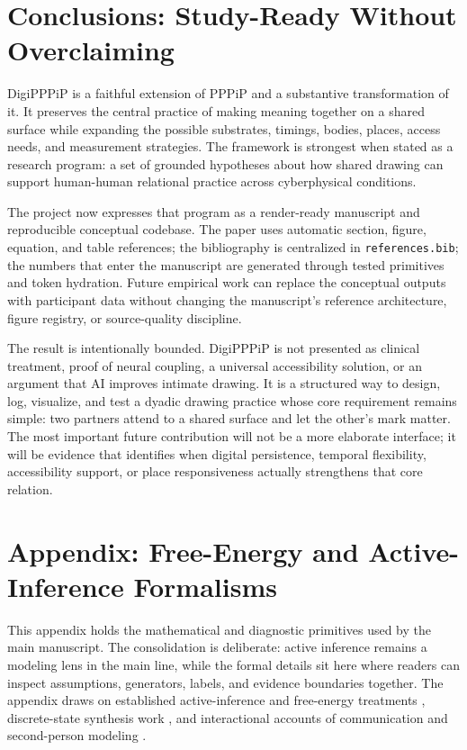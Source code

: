 \documentclass[
  english,
]{article}
\begin{document}
\newpage

\section{Conclusions: Study-Ready Without
Overclaiming}\label{sec:conclusions}

DigiPPPiP is a faithful extension of PPPiP and a substantive
transformation of it. It preserves the central practice of making
meaning together on a shared surface while expanding the possible
substrates, timings, bodies, places, access needs, and measurement
strategies. The framework is strongest when stated as a research
program: a set of grounded hypotheses about how shared drawing can
support human-human relational practice across cyberphysical conditions.

The project now expresses that program as a render-ready manuscript and
reproducible conceptual codebase. The paper uses automatic section,
figure, equation, and table references; the bibliography is centralized
in \texttt{references.bib}; the numbers that enter the manuscript are
generated through tested primitives and token hydration. Future
empirical work can replace the conceptual outputs with participant data
without changing the manuscript's reference architecture, figure
registry, or source-quality discipline.

The result is intentionally bounded. DigiPPPiP is not presented as
clinical treatment, proof of neural coupling, a universal accessibility
solution, or an argument that AI improves intimate drawing. It is a
structured way to design, log, visualize, and test a dyadic drawing
practice whose core requirement remains simple: two partners attend to a
shared surface and let the other's mark matter. The most important
future contribution will not be a more elaborate interface; it will be
evidence that identifies when digital persistence, temporal flexibility,
accessibility support, or place responsiveness actually strengthens that
core relation.

\newpage

\section{Appendix: Free-Energy and Active-Inference
Formalisms}\label{sec:formalisms_appendix}

This appendix holds the mathematical and diagnostic primitives used by
the main manuscript. The consolidation is deliberate: active inference
remains a modeling lens in the main line, while the formal details sit
here where readers can inspect assumptions, generators, labels, and
evidence boundaries together. The appendix draws on established
active-inference and free-energy treatments
\citep{friston2010fep, friston2017process, parr2022activeinference, friston2023simpler},
discrete-state synthesis work \citep{dacosta2020discrete}, and
interactional accounts of communication and second-person modeling
\citep{vasil2020communication, schilbach2013secondperson, redcay2019secondperson, bolis2024secondperson}.
\end{document}
